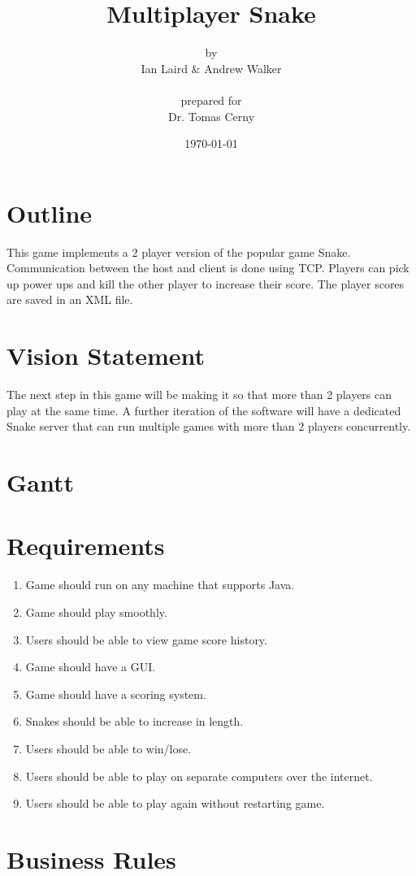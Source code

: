 \documentclass[titlepage]{article}
\title{{\Huge Multiplayer Snake}\\\vspace{3mm}{\large Software Engineering 1 \& Intro to Java}}
\date{\today}
\author{{\normalsize by}\\{\large Ian Laird \& Andrew Walker}\\ \\ {\normalsize prepared for}\\Dr. Tomas Cerny}
\begin{document}
	\maketitle
	\section{Outline}
	This game implements a 2 player version of the popular game Snake. Communication between the host and client is done using TCP. Players can pick up power ups and kill the other player to increase their score. The player scores are saved in an XML file.

	\section{Vision Statement}
	The next step in this game will be making it so that more than 2 players can play at the same time. A further iteration of the software will have a dedicated Snake server that can run multiple games with more than 2 players concurrently.
	
	\section{Gantt}
	
	\section{Requirements}
	\begin{enumerate}
		\item Game should run on any machine that supports Java.
		\item Game should play smoothly.
		\item Users should be able to view game score history.
		\item Game should have a GUI.
		\item Game should have a scoring system.
		\item Snakes should be able to increase in length.
		\item Users should be able to win/lose.
		\item Users should be able to play on separate computers over the internet.
		\item Users should be able to play again without restarting game.
	\end{enumerate}
	
	\section{Business Rules}
	
\end{document}
